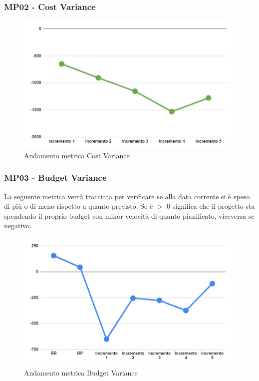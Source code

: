 \subsubsection{MP02 - Cost Variance}

\begin{figure}[H]
	\centering
	\includegraphics[width=11cm]{images/cost_variance.png}
	\caption{Andamento metrica Cost Variance}
\end{figure}

\subsubsection{MP03 - Budget Variance}
La seguente metrica verrà tracciata per verificare se alla data corrente si è speso di più o di meno rispetto a quanto previsto.
Se è $>$ 0 significa che il progetto sta spendendo il proprio budget con minor velocità di quanto pianificato, viceversa se negativo.
\begin{figure}[H]
	\centering
	\includegraphics[width=11cm]{images/budget_variance.png}
	\caption{Andamento metrica Budget Variance}
\end{figure}

